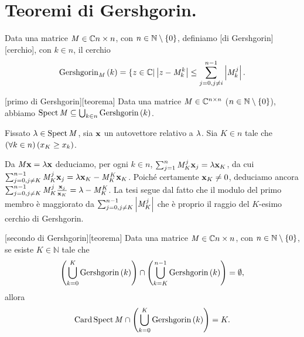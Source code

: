 \section{Teoremi di Gershgorin.}
\label{MetodiNumericiPerProblemiAgliAutovalori_Gershgorin}
\begin{Definition}
	Data una matrice
  $\mathit{M} \in \mathbb{C}{n \times n}$,
  con
  $n \in \mathbb{N} \setminus \lbrace 0 \rbrace$, definiamo
  [di Gershgorin][cerchio],
  con
  $k \in n$, il cerchio
  \[
    \GershgorinDisk{k}[\Matrix]
    = \lbrace z \in \mathbb{C} |
      \AbsoluteValue{z - \Matrix_k^k} \leq
      \sum_{j = 0,\\j \neq i}^{n - 1} \AbsoluteValue{\Matrix_k^j}.
  \]
\end{Definition}
\begin{Theorem}
	[primo di Gershgorin][teorema]
  Data una matrice
  $\mathit{M} \in \mathbb{C}^{n \times n}$
  ($n \in \mathbb{N} \setminus \lbrace 0 \rbrace$),
  abbiamo
  $\Spectrum{\Matrix} \subseteq \bigcup_{k \in n} \GershgorinDisk{k}$.
\end{Theorem}
\Proof Fissato $\lambda \in \operatorname{Spect}{\mathit{M}}$, sia
$\Eigenvector$ un autovettore relativo a $\lambda$.
Sia $K \in n$ tale che $\left ( \forall k \in n \right ) \left ( x_K \geq x_k \right )$.
\par Da
$\Matrix \Eigenvector = \Eigenvalue \Eigenvector$
deduciamo, per ogni $k \in n$,
$\sum_{j = 1}^n \Matrix_K^j \Eigenvector_j = \Eigenvalue \Eigenvector_K$,
da cui
$\sum_{j = 0,\\j \neq K}^{n - 1} \Matrix_K^j \Eigenvector_j
= \Eigenvalue \Eigenvector_K - \Matrix_K^K \Eigenvector_K$.
Poich\'e certamente $\Eigenvector_K \neq 0$, deduciamo ancora
$\sum_{j = 0,\\j \neq K}^{n - 1}
\Matrix_K^j \frac{\Eigenvector_j}{\Eigenvector_K}
= \Eigenvalue - \Matrix_K^K$.
La tesi segue dal fatto che il modulo del primo membro \`e maggiorato da
$\sum_{j = 0,\\j \neq K}^{n - 1} \left \lvert \mathit{M}_K^j \right \rvert$
che \`e proprio il raggio del $K$-esimo cerchio di Gershgorin. \EndProof
\begin{Theorem}
	[secondo di Gershgorin][teorema]
  Data una matrice $\mathit{M} \in \mathbb{C}{n \times n}$, con
  $n \in \mathbb{N} \setminus \lbrace 0 \rbrace$,
  se esiste $K \in \mathbb{N}$ tale che
  \[
    \left ( \bigcup_{k = 0}^K \GershgorinDisk{k} \right ) \cap \left ( \bigcup_{k = K}^{n - 1} \GershgorinDisk{k} \right ) = \emptyset,
  \]
  allora
  \[
    \Cardinality{\Spectrum{\Matrix} \cap \left ( \bigcup_{k = 0}^K \GershgorinDisk{k} \right )} = K.
  \]
\end{Theorem}
